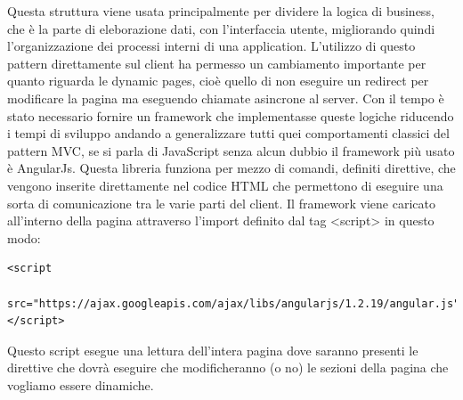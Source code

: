 Questa struttura viene usata principalmente per dividere la logica di business, che è la parte di eleborazione dati, con l'interfaccia utente, migliorando quindi l'organizzazione dei processi interni di una application.
L'utilizzo di questo pattern direttamente sul client ha permesso un cambiamento importante per quanto riguarda le dynamic pages, cioè quello di non eseguire un redirect per modificare la pagina ma eseguendo chiamate asincrone al server.
Con il tempo è stato necessario fornire un framework che implementasse queste logiche riducendo i tempi di sviluppo andando a generalizzare tutti quei comportamenti classici del pattern MVC, se si parla di JavaScript senza alcun dubbio il framework più usato è AngularJs.
Questa libreria funziona per mezzo di comandi, definiti direttive, che vengono inserite direttamente nel codice HTML che permettono di eseguire una sorta di comunicazione tra le varie parti del client. Il framework viene caricato all'interno della pagina attraverso l'import definito dal tag <script> in questo modo:
\begin{lstlisting}
<script
 src="https://ajax.googleapis.com/ajax/libs/angularjs/1.2.19/angular.js">
</script>
\end{lstlisting}
Questo script esegue una lettura dell'intera pagina dove saranno presenti le direttive che dovrà eseguire che modificheranno (o no) le sezioni della pagina che vogliamo essere dinamiche.





